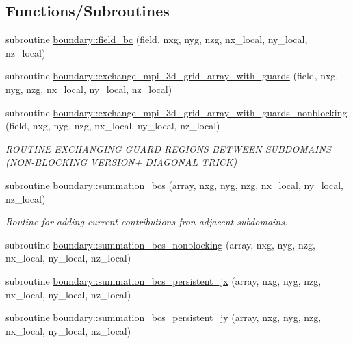 \subsection*{Functions/\+Subroutines}
\begin{DoxyCompactItemize}
\item 
subroutine \hyperlink{namespaceboundary_aaf2c39f38c9f0330fd2501f49ef34b7d}{boundary\+::field\+\_\+bc} (field, nxg, nyg, nzg, nx\+\_\+local, ny\+\_\+local, nz\+\_\+local)
\item 
subroutine \hyperlink{namespaceboundary_a7fcd1d8e118d647057f0523af107674e}{boundary\+::exchange\+\_\+mpi\+\_\+3d\+\_\+grid\+\_\+array\+\_\+with\+\_\+guards} (field, nxg, nyg, nzg,                                               nx\+\_\+local, ny\+\_\+local, nz\+\_\+local)
\item 
subroutine \hyperlink{namespaceboundary_a4e895aead34d40e905893ad3a0ee3d32}{boundary\+::exchange\+\_\+mpi\+\_\+3d\+\_\+grid\+\_\+array\+\_\+with\+\_\+guards\+\_\+nonblocking} (field, nxg, nyg, nzg,                                               nx\+\_\+local, ny\+\_\+local, nz\+\_\+local)
\begin{DoxyCompactList}\small\item\em R\+O\+U\+T\+I\+NE E\+X\+C\+H\+A\+N\+G\+I\+NG G\+U\+A\+RD R\+E\+G\+I\+O\+NS B\+E\+T\+W\+E\+EN S\+U\+B\+D\+O\+M\+A\+I\+NS (N\+O\+N-\/\+B\+L\+O\+C\+K\+I\+NG V\+E\+R\+S\+I\+O\+N+ D\+I\+A\+G\+O\+N\+AL T\+R\+I\+CK) \end{DoxyCompactList}\item 
subroutine \hyperlink{namespaceboundary_ad298755064359a32a3e7d89b376329cf}{boundary\+::summation\+\_\+bcs} (array, nxg, nyg, nzg, nx\+\_\+local, ny\+\_\+local, nz\+\_\+local)
\begin{DoxyCompactList}\small\item\em Routine for adding current contributions fron adjacent subdomains. \end{DoxyCompactList}\item 
subroutine \hyperlink{namespaceboundary_a1ad86bf436bc91d3210fdf0f6d86ab1f}{boundary\+::summation\+\_\+bcs\+\_\+nonblocking} (array, nxg, nyg, nzg, nx\+\_\+local, ny\+\_\+local, nz\+\_\+local)
\item 
subroutine \hyperlink{namespaceboundary_ac7114eb91bced14ba975f1467fb2db08}{boundary\+::summation\+\_\+bcs\+\_\+persistent\+\_\+jx} (array, nxg, nyg, nzg, nx\+\_\+local, ny\+\_\+local, nz\+\_\+local)
\item 
subroutine \hyperlink{namespaceboundary_ac7a1a01d802cba6dd53260db0cb76a93}{boundary\+::summation\+\_\+bcs\+\_\+persistent\+\_\+jy} (array, nxg, nyg, nzg, nx\+\_\+local, ny\+\_\+local, nz\+\_\+local)

\end{DoxyCompactItemize}
